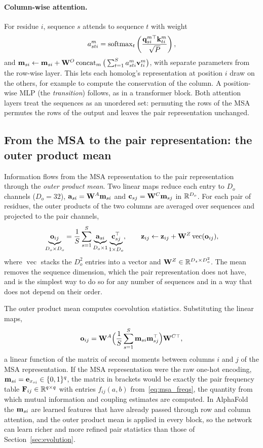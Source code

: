 \paragraph{Column-wise attention.} For residue $i$, sequence $s$ attends to sequence $t$ with weight
\begin{equation}
  a^m_{sti} = \operatorname{softmax}_t\left(\frac{\mathbf{q}^{m\top}_{si}\mathbf{k}^m_{ti}}{\sqrt{P}}\right),
\end{equation}
and $\mathbf{m}_{si}\leftarrow\mathbf{m}_{si}+\mathbf{W}^O\operatorname{concat}_m\big(\sum_{t=1}^S a^m_{sti}\mathbf{v}^m_{ti}\big)$, with separate parameters from the row-wise layer. This lets each homolog's representation at position $i$ draw on the others, for example to compute the conservation of the column. A position-wise MLP (the \emph{transition}) follows, as in a transformer block. Both attention layers treat the sequences as an unordered set: permuting the rows of the MSA permutes the rows of the output and leaves the pair representation unchanged.

\subsection{From the MSA to the pair representation: the outer product mean}

Information flows from the MSA representation to the pair representation through the \emph{outer product mean}. Two linear maps reduce each entry to $D_o$ channels ($D_o=32$), $\mathbf{a}_{si}=\mathbf{W}^A\mathbf{m}_{si}$ and $\mathbf{c}_{sj}=\mathbf{W}^C\mathbf{m}_{sj}$ in $\mathbb{R}^{D_o}$. For each pair of residues, the outer products of the two columns are averaged over sequences and projected to the pair channels,
\begin{equation}
  \underbrace{\mathbf{o}_{ij}}_{D_o\times D_o} = \frac{1}{S}\sum_{s=1}^S \underbrace{\mathbf{a}_{si}}_{D_o\times1}\underbrace{\mathbf{c}_{sj}^\top}_{1\times D_o}, \qquad
  \mathbf{z}_{ij} \leftarrow \mathbf{z}_{ij} + \mathbf{W}^Z\operatorname{vec}(\mathbf{o}_{ij}),
  \label{eq:opm}
\end{equation}
where $\operatorname{vec}$ stacks the $D_o^2$ entries into a vector and $\mathbf{W}^Z\in\mathbb{R}^{D_z\times D_o^2}$. The mean removes the sequence dimension, which the pair representation does not have, and is the simplest way to do so for any number of sequences and in a way that does not depend on their order.

The outer product mean computes coevolution statistics. Substituting the linear maps,
\begin{equation}
  \mathbf{o}_{ij} = \mathbf{W}^A\Big(\frac{1}{S}\sum_{s=1}^S\mathbf{m}_{si}\mathbf{m}_{sj}^\top\Big)\mathbf{W}^{C\top},
\end{equation}
a linear function of the matrix of second moments between columns $i$ and $j$ of the MSA representation. If the MSA representation were the raw one-hot encoding, $\mathbf{m}_{si}=\mathbf{e}_{x_{si}}\in\{0,1\}^q$, the matrix in brackets would be exactly the pair frequency table $\mathbf{F}_{ij}\in\mathbb{R}^{q\times q}$ with entries $f_{ij}(a,b)$ from~\eqref{eq:msa_freqs}, the quantity from which mutual information and coupling estimates are computed. In AlphaFold the $\mathbf{m}_{si}$ are learned features that have already passed through row and column attention, and the outer product mean is applied in every block, so the network can learn richer and more refined pair statistics than those of Section~\ref{sec:evolution}.

